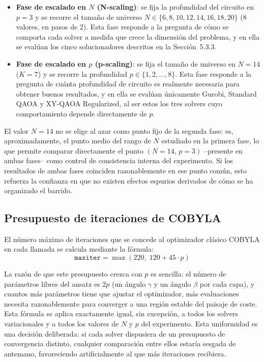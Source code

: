 \begin{itemize}
    \item \textbf{Fase de escalado en $N$ (N-scaling)}: se fija la profundidad del circuito en $p=3$ y se recorre el tamaño de universo $N \in \{6, 8, 10, 12, 14, 16, 18, 20\}$ (8 valores, en pasos de 2). Esta fase responde a la pregunta de cómo se comporta cada solver a medida que crece la dimensión del problema, y en ella se evalúan los cinco solucionadores descritos en la Sección~5.3.3.
    \item \textbf{Fase de escalado en $p$ (p-scaling)}: se fija el tamaño de universo en $N=14$ ($K=7$) y se recorre la profundidad $p \in \{1, 2, \dots, 8\}$. Esta fase responde a la pregunta de cuánta profundidad de circuito es realmente necesaria para obtener buenos resultados, y en ella se evalúan únicamente Gurobi, Standard QAOA y XY-QAOA Regularized, al ser estos los tres solvers cuyo comportamiento depende directamente de $p$.
\end{itemize}

El valor $N=14$ no se elige al azar como punto fijo de la segunda fase: es, aproximadamente, el punto medio del rango de $N$ estudiado en la primera fase, lo que permite comparar directamente el punto $(N=14,\,p=3)$ --presente en ambas fases-- como control de consistencia interna del experimento. Si los resultados de ambas fases coinciden razonablemente en ese punto común, esto refuerza la confianza en que no existen efectos espurios derivados de cómo se ha organizado el barrido.

\subsection{Presupuesto de iteraciones de COBYLA}

El número máximo de iteraciones que se concede al optimizador clásico COBYLA en cada llamada se calcula mediante la fórmula:
\begin{equation}
    \texttt{maxiter} = \max(220,\; 120 + 45 \cdot p)
    \label{eq:maxiter}
\end{equation}

La razón de que este presupuesto crezca con $p$ es sencilla: el número de parámetros libres del ansatz es $2p$ (un ángulo $\gamma$ y un ángulo $\beta$ por cada capa), y cuantos más parámetros tiene que ajustar el optimizador, más evaluaciones necesita razonablemente para converger a una región estable del paisaje de coste. Esta fórmula se aplica exactamente igual, sin excepción, a todos los solvers variacionales y a todos los valores de $N$ y $p$ del experimento. Esta uniformidad es una decisión deliberada: si cada solver dispusiera de un presupuesto de convergencia distinto, cualquier comparación entre ellos estaría sesgada de antemano, favoreciendo artificialmente al que más iteraciones recibiera.

